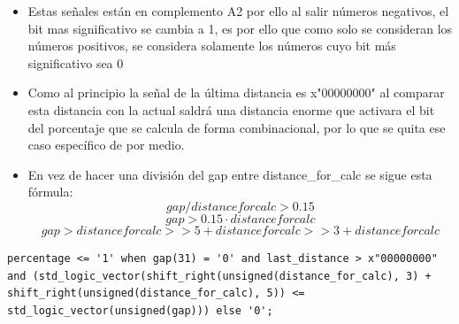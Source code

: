 \begin{itemize}
    \item Estas señales están en complemento A2 por ello al salir números negativos, el bit mas significativo se cambia a 1, es por ello que como solo se consideran los números positivos, se
     considera solamente los números cuyo bit más significativo sea 0
    \item Como al principio la señal de la última distancia es x"00000000" al comparar esta distancia con la actual saldrá una distancia enorme que activara el bit del porcentaje que se calcula 
    de forma combinacional, por lo que se quita ese caso específico de por medio.
    \item En vez de hacer una división del gap entre distance\_for\_calc se sigue esta fórmula:
    \[ gap/distanceforcalc > 0.15\] 
    \[gap > 0.15 \cdot distanceforcalc \] 
    \[gap > distanceforcalc>> 5 + distanceforcalc>> 3 + distanceforcalc\] 
\end{itemize}

\lstset{language=VHDL, breaklines=true, basicstyle=\footnotesize}
\begin{lstlisting}[frame=single]
    percentage <= '1' when gap(31) = '0' and last_distance > x"00000000" and (std_logic_vector(shift_right(unsigned(distance_for_calc), 3) + shift_right(unsigned(distance_for_calc), 5)) <= std_logic_vector(unsigned(gap))) else '0';
\end{lstlisting}



